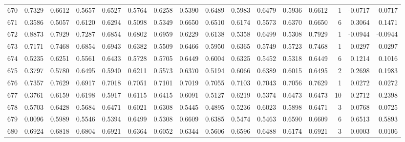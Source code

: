 \begin{tabular}{lrrrrrrrrrrrrrrr}
670 &      0.7329 &  0.6612 &  0.5657 &  0.6527 &  0.5764 &  0.6258 &  0.5390 &  0.6489 &  0.5983 &  0.6479 &   0.5936 &     0.6612 &      1 &                   -0.0717 &                    -0.0717 \\
671 &      0.3586 &  0.5057 &  0.6120 &  0.6294 &  0.5098 &  0.5349 &  0.6650 &  0.6510 &  0.6174 &  0.5573 &   0.6370 &     0.6650 &      6 &                    0.3064 &                     0.1471 \\
672 &      0.8873 &  0.7929 &  0.7287 &  0.6854 &  0.6802 &  0.6959 &  0.6229 &  0.6138 &  0.5358 &  0.6499 &   0.5308 &     0.7929 &      1 &                   -0.0944 &                    -0.0944 \\
673 &      0.7171 &  0.7468 &  0.6854 &  0.6943 &  0.6382 &  0.5509 &  0.6466 &  0.5950 &  0.6365 &  0.5749 &   0.5723 &     0.7468 &      1 &                    0.0297 &                     0.0297 \\
674 &      0.5235 &  0.6251 &  0.5561 &  0.6433 &  0.5728 &  0.5705 &  0.6449 &  0.6004 &  0.6325 &  0.5452 &   0.5318 &     0.6449 &      6 &                    0.1214 &                     0.1016 \\
675 &      0.3797 &  0.5780 &  0.6495 &  0.5940 &  0.6211 &  0.5573 &  0.6370 &  0.5194 &  0.6066 &  0.6389 &   0.6015 &     0.6495 &      2 &                    0.2698 &                     0.1983 \\
676 &      0.7357 &  0.7629 &  0.6917 &  0.7018 &  0.7051 &  0.7101 &  0.7019 &  0.7055 &  0.7103 &  0.7043 &   0.7056 &     0.7629 &      1 &                    0.0272 &                     0.0272 \\
677 &      0.3761 &  0.6159 &  0.6198 &  0.5917 &  0.6115 &  0.6415 &  0.6091 &  0.5127 &  0.6219 &  0.5374 &   0.6473 &     0.6473 &     10 &                    0.2712 &                     0.2398 \\
678 &      0.5703 &  0.6428 &  0.5684 &  0.6471 &  0.6021 &  0.6308 &  0.5445 &  0.4895 &  0.5236 &  0.6023 &   0.5898 &     0.6471 &      3 &                    0.0768 &                     0.0725 \\
679 &      0.0096 &  0.5989 &  0.5546 &  0.5394 &  0.6499 &  0.5308 &  0.6609 &  0.6385 &  0.5474 &  0.5463 &   0.6590 &     0.6609 &      6 &                    0.6513 &                     0.5893 \\
680 &      0.6924 &  0.6818 &  0.6804 &  0.6921 &  0.6364 &  0.6052 &  0.6344 &  0.5606 &  0.6596 &  0.6488 &   0.6174 &     0.6921 &      3 &                   -0.0003 &                    -0.0106 \\

\end{tabular}

